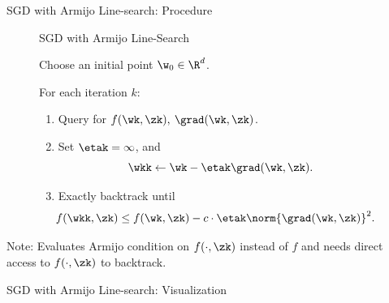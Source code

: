 \documentclass[mathserif,notheorems, hyperref={colorlinks, citecolor=blue, urlcolor=blue, linkcolor=blue}]{beamer}
\begin{document}
    \begin{frame}{SGD with Armijo Line-search: Procedure}
        
        \begin{figure}[t]
            \begin{procedure}{SGD with Armijo Line-Search}
            \item Choose an initial point \( \w_0 \in \R^d \).
                \vspace{1ex}
            \item For each iteration \( k \):
                \begin{enumerate}
                    \item Query \oracle{} for \( f(\wk, \zk), \: \grad(\wk, \zk) \). 
                        \vspace{0.5ex}
                    \item Set \( \etak = \infty \), and \[ \wkk \gets \wk - \etak \grad(\wk, \zk). \]
                    \item Exactly backtrack until
                        \[  \hspace{-1em} f(\wkk, \zk) \leq f(\wk, \zk) - c \cdot \etak \norm{\grad(\wk, \zk)}^2. \]
                \end{enumerate}
            \end{procedure}
        \end{figure}

        Note: Evaluates Armijo condition on \( f(\cdot, \zk) \) instead of \( f \) and needs direct access to \( f(\cdot, \zk) \) to backtrack. 

    \end{frame}

    \begin{frame}{SGD with Armijo Line-search: Visualization}
        \begin{figure}[]
            \centering
            
        \end{figure} 
    \end{frame}
\end{document}
